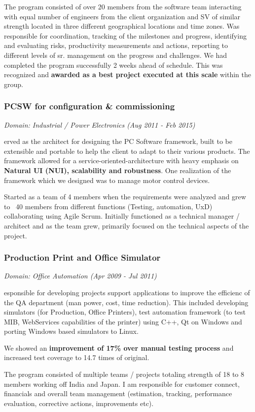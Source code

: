 \documentclass[a4paper,11pt]{article}
\newcommand\cvprojectentry[5]{
  \subsubsection*{#1}
  
  \vspace{-7pt}
  
  \it{Domain: #2}\normalfont{} \quad (#3 - #4)
  
}
\begin{document}
The program consisted of over 20 members from the software team
interacting with equal number of engineers from the client
organization and SV of similar strength located in three different
geographical locations and time zones. Was responsible for
coordination, tracking of the milestones and progress, identifying and
evaluating risks, productivity measurements and actions, reporting to
different levels of sr. management on the progress and challenges. We
had completed the program successfully 2 weeks ahead of schedule. This
was recognized and \textbf{awarded as a best project executed at this
scale} within the group.

\begin{multicols}{2}

\cvprojectentry{PCSW for configuration \& commissioning}{Industrial / Power Electronics}{Aug 2011}{Feb 2015}

Served as the architect for designing the PC Software framework, built
to be extensible and portable to help the client to adapt to their
various products. The framework allowed for a
service-oriented-architecture with heavy emphasis on \textbf{Natural
  UI (NUI), scalability and robustness}. One realization of the
framework which we designed was to manage motor control devices.
 
Started as a team of 4 members when the requirements were analyzed and
grew to ~40 members from different functions (Testing, automation,
UxD) collaborating using Agile Scrum. Initially functioned as a
technical manager / architect and as the team grew, primarily focused
on the technical aspects of the project.

\cvprojectentry{Production Print and Office Simulator}{Office Automation}{Apr 2009}{Jul 2011}
 
Responsible for developing projects support applications to improve
the efficienc of the QA department (man power, cost, time
reduction). This included developing simulators (for Production,
Office Printers), test automation framework (to test MIB, WebServices
capabilities of the printer) using C++, Qt on Windows and porting
Windows based simulators to Linux.
 
We showed an \textbf{improvement of 17\% over manual testing process} and
increased test coverage to 14.7 times of original.
 
The program consisted of multiple teams / projects totaling strength
of 18 to 8 members working off India and Japan. I am responsible for
customer connect, financials and overall team management (estimation,
tracking, performance evaluation, corrective actions, improvements
etc).
 

\end{multicols}
\end{document}
